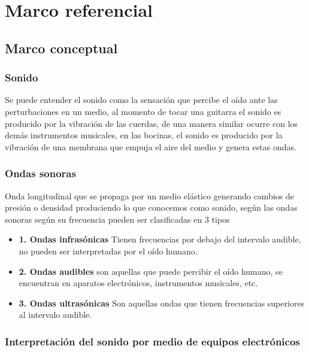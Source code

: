 \chapter{Marco referencial}


\section{Marco conceptual}

\subsection{Sonido}
Se puede entender el sonido como la sensación que percibe el oído ante las perturbaciones en un medio, al momento de tocar una guitarra el sonido es producido por la vibración de las cuerdas, de una manera similar ocurre con los demás instrumentos musicales, en las bocinas, el sonido es producido por la vibración de una membrana que empuja el aire del medio y genera estas ondas. \cite{fisica_conceptual}
\subsection{Ondas sonoras}

Onda longitudinal que se propaga por un medio elástico generando cambios de presión o densidad produciendo lo que conocemos como sonido, según \cite{fisica_serway} las ondas sonoras según su frecuencia pueden ser clasificadas en 3 tipos 
\bigskip

\begin{itemize}
    \item\textbf{1. Ondas infrasónicas} Tienen frecuencias por debajo del intervalo audible, no pueden ser interpretadas por el oído humano.
    \item\textbf{2. Ondas audibles} son aquellas que puede percibir el oído humano, se encuentran en aparatos electrónicos, instrumentos musicales, etc.
    \item \textbf{3. Ondas ultrasónicas} Son aquellas ondas que tienen frecuencias superiores al intervalo audible. 
\end{itemize}


\subsection{Interpretación del sonido por medio de equipos electrónicos}

